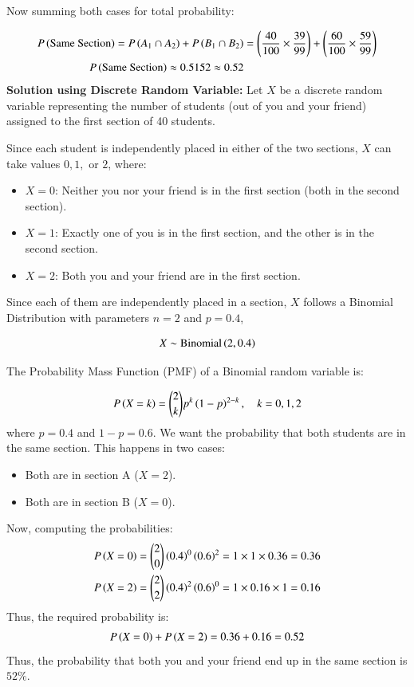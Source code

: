 \documentclass[journal,12pt,onecolumn]{IEEEtran}
\theoremstyle{remark}
\begin{document}
Now summing both cases for total probability:

\begin{align}
P\left(\text{Same Section}\right) = P\left(A_1\cap A_2\right)+P\left(B_1\cap B_2\right)
&= \left( \frac{40}{100} \times \frac{39}{99} \right) + \left( \frac{60}{100} \times \frac{59}{99} \right)\\
P\left(\text{Same Section}\right) \approx 0.5152 \approx 0.52
\end{align}
\textbf{Solution using Discrete Random Variable:}
Let $ X $ be a discrete random variable representing the number of students (out of you and your friend) assigned to the first section of 40 students.

Since each student is independently placed in either of the two sections, $ X $ can take values $0, 1,$ or $2$, where:
\begin{itemize}
    \item $X = 0 $: Neither you nor your friend is in the first section (both in the second section).
    \item $X = 1 $: Exactly one of you is in the first section, and the other is in the second section.
    \item $ X = 2 $: Both you and your friend are in the first section.
\end{itemize}
Since each of them are independently placed in a section, $X$ follows a Binomial Distribution with parameters $n = 2 $ and $ p = 0.4 $,

\begin{align}
X \sim \text{Binomial}\left(2, 0.4\right)
\end{align}

The Probability Mass Function (PMF) of a Binomial random variable is:

\begin{align}
P\left(X = k\right) = \binom{2}{k} p^k \left(1 - p\right)^{2-k}, \quad k = 0,1,2
\end{align}
where $p = 0.4 $ and $ 1 - p = 0.6 $.
We want the probability that both students are in the same section. This happens in two cases:
\begin{itemize}
    \item Both are in section A ($ X = 2 $).
    \item Both are in section B ($ X = 0 $).
\end{itemize}
Now, computing the probabilities:
\begin{align}
P\left(X = 0\right) &= \binom{2}{0} \left(0.4\right)^0 \left(0.6\right)^2 = 1 \times 1 \times 0.36 = 0.36\\
P\left(X = 2\right) &= \binom{2}{2} \left(0.4\right)^2 \left(0.6\right)^0 = 1 \times 0.16 \times 1 = 0.16
\end{align}
Thus, the required probability is:
\begin{align}
P\left(X = 0\right) + P\left(X = 2\right) = 0.36 + 0.16 = 0.52
\end{align}
Thus, the probability that both you and your friend end up in the same section is $52\%$.
\end{document}
